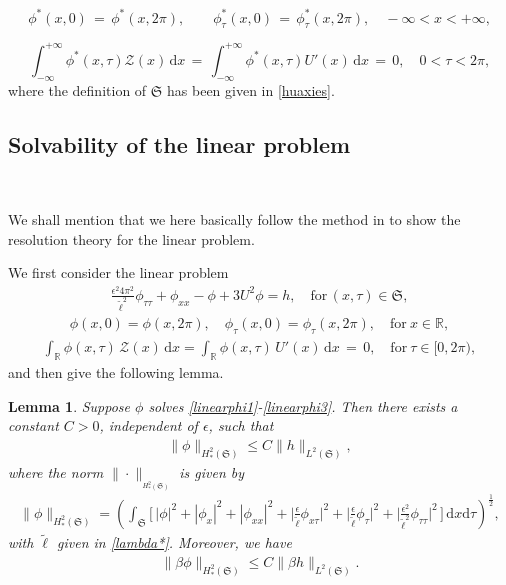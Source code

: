 \documentclass[10pt, reqno]{amsart}
\numberwithin{equation}{section}
\newtheorem{lemma}[theorem]{Lemma}
\theoremstyle{definition}
\begin{document}
{{\begin{equation}
\phi^*(x, 0) \,=\, \phi^*(x, 2\pi), \qquad \phi^*_\tau(x, 0) \,=\, \phi^*_\tau(x, 2\pi),
\quad
-\infty<x<+\infty,
\label{periodic condition}
\end{equation}

\begin{equation}
\label{projectedproblem3}
 \int_{-\infty}^{+\infty} \phi^*(x, \tau){\mathcal Z}(x) \,{\mathrm d}x
 \,=\, \int_{-\infty}^{+\infty} \phi^*(x, \tau) U'(x)\,{\mathrm d}x
 \,=\, 0, \quad 0<\tau<2\pi,
\end{equation}
where the definition of $\mathfrak S$ has been given in \eqref{huaxies}.




\medskip
\subsection{ Solvability of the linear problem}\label{Section6.2}\

We shall mention that we here basically follow the method in \cite{delPKowWei1} to show the resolution theory for the linear problem.


We first consider the linear problem
\begin{align} \label{linearphi1}
 \frac{\epsilon^2 4\pi^2}{{\tilde\ell}^2} \phi_{\tau\tau} + \phi_{xx} - \phi+3U^2 \phi = h,
\quad \text{for}\,(x, \tau)\in \mathfrak S,
\end{align}
\begin{align}
 \phi(x, 0) = \phi(x, 2\pi), \quad \phi_\tau(x, 0) = \phi_\tau(x, 2\pi), \quad \text{for}~x\in {\mathbb R},
\label{linearphi2}
\end{align}
\begin{align} \label{linearphi3}
 \int_{\mathbb R}\phi(x, \tau)\,\mathcal Z(x) \,{\mathrm d}x = \int_{\mathbb R}\phi(x, \tau)\,U'(x)\,{\mathrm d}x \,=\, 0, \quad \text{for}~\tau\in [0, 2\pi),
\end{align}
and then give the following lemma.
\begin{lemma}\label{linear lemma6-1}
 Suppose $\phi$ solves \eqref{linearphi1}-\eqref{linearphi3}. Then there exists a constant $C>0$, independent of $\epsilon$, such that
\begin{align} \label{norm h2 mathfrak S estimate}
 \|\phi\|_{H^2_*(\mathfrak S)} \leq C \|h\|_{L^2(\mathfrak S)},
\end{align}
where the  norm  $\|\cdot\|_{_{H^2_*(\mathfrak S)}}$ is given by
\begin{align} \label{norm h2 mathfrak S}
\|\phi\|_{H^2_*(\mathfrak S)}
= \left({\displaystyle\int}_{\mathfrak S} \Bigg[\, |\phi|^2+ |\phi_{x}|^2+ |\phi_{xx}|^2 +\Big|\frac{\epsilon}{\tilde\ell}\phi_{x\tau}\Big|^2
+ \Big|\frac{\epsilon}{\tilde\ell}\phi_{\tau}\Big|^2 + \Big|\frac{\epsilon^2}{\tilde\ell^2}\phi_{\tau\tau}\Big|^2 \, \Bigg] \,{\mathrm d}x {\mathrm d}\tau \right)^{\frac12},
\end{align}
with ${\tilde\ell}$ given in \eqref{lambda*}.
Moreover,
we have
\begin{align} \label{betanorm h2 mathfrak S estimate}
 \|\beta\phi\|_{H^2_*(\mathfrak S)} \leq C \|\beta h\|_{L^2(\mathfrak S)}.
\end{align}


\end{lemma}}}
\end{document}

